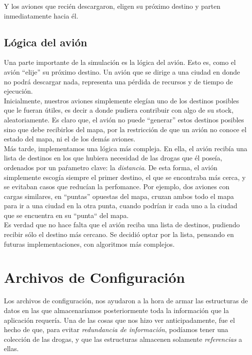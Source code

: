 \documentclass[a4paper,10pt]{article}
\begin{document}
Y los aviones que recién descargaron, eligen su próximo destino y parten inmediatamente hacia él.

\subsection{Lógica del avión}

Una parte importante de la simulación es la lógica del avión. Esto es, como el avión ``elije'' su próximo destino. Un avión que se dirige a una ciudad en donde no 
podrá descargar nada, representa una pérdida de recursos y de tiempo de ejecución.\\

Inicialmente, nuestros aviones simplemente elegían uno de los destinos posibles que le fueran útiles, es decir a donde pudiera contribuir con algo de su stock, 
aleatoriamente. Es claro que, el avión no puede ``generar'' estos destinos posibles sino que debe recibirlos del mapa, por la restricción de que un avión no 
conoce el estado del mapa, ni el de los demás aviones.\\

Más tarde, implementamos una lógica más compleja. En ella, el avión recibía una lista de destinos en los que hubiera necesidad de las drogas que él poseía, 
ordenados por un paŕametro clave: la \textit{distancia}. De esta forma, el avión simplemente escogía siempre el primer destino, el que se encontraba más cerca, y 
se evitaban casos que reducían la perfomance. Por ejemplo, dos aviones con cargas similares, en ``puntas'' opuestas del mapa, cruzan ambos todo el mapa para ir a una 
ciudad en la otra punta, cuando podrían ir cada uno a la ciudad que se encuentra en su ``punta`` del mapa.\\

Es verdad que no hace falta que el avión reciba una lista de destinos, pudiendo recibir sólo el destino más cercano. Se decidió optar por la lista, pensando en futuras
implementaciones, con algoritmos más complejos.

\newpage
\section{Archivos de Configuración}

Los archivos de configuración, nos ayudaron a la hora de armar las estructuras de datos en las que almacenaríamos posteriormente toda la información que la 
aplicación requería. Una de las cosas que nos hizo ver anticipadamente, fue el hecho de que, para evitar \textit{redundancia de información}, podíamos tener 
una colección de las drogas, y que las estructuras almacenen solamente \textit{referencias} a ellas. 
\end{document}

